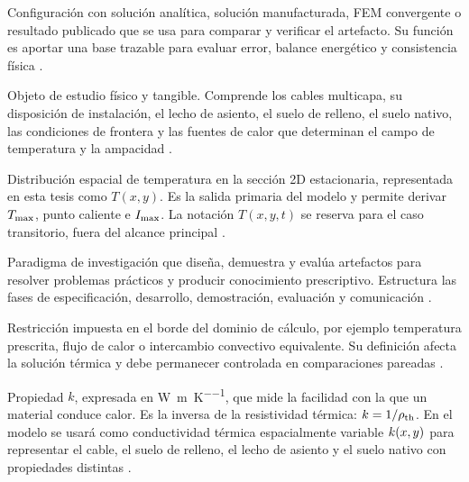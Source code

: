 \begin{description}[style=nextline,itemsep=0.5\baselineskip,parsep=0pt,topsep=0.25\baselineskip]
  \item[Caso de referencia o \textit{benchmark}.] Configuración con solución analítica, solución manufacturada, FEM convergente o resultado publicado que se usa para comparar y verificar el artefacto. Su función es aportar una base trazable para evaluar error, balance energético y consistencia física \parencites{cigre2022}[93--99]{cigre2025}.

  \item[Arreglo de cables--entorno térmico.] Objeto de estudio físico y tangible. Comprende los cables multicapa, su disposición de instalación, el lecho de asiento, el suelo de relleno, el suelo nativo, las condiciones de frontera y las fuentes de calor que determinan el campo de temperatura y la ampacidad \parencites[752--760]{neher1957}{anders2005}[3--5]{enescu2020}[4--6]{enescu2021}[1,10,16]{kim2025}.

  \item[Campo de temperatura.] Distribución espacial de temperatura en la sección 2D estacionaria, representada en esta tesis como $T(x,y)$. Es la salida primaria del modelo y permite derivar $T_{\max}$, punto caliente e $I_{\max}$. La notación $T(x,y,t)$ se reserva para el caso transitorio, fuera del alcance principal \parencites{carslaw1959conduction,kakac2018heatConduction,hahn2012heatConduction}[1,3,16]{pan2025}.

  \item[Ciencia del diseño o DSR.] Paradigma de investigación que diseña, demuestra y evalúa artefactos para resolver problemas prácticos y producir conocimiento prescriptivo. Estructura las fases de especificación, desarrollo, demostración, evaluación y comunicación \parencites[54--56]{peffers2007}[342--351]{gregor2013}[198--203]{delport2024}.

  \item[Condición de contorno.] Restricción impuesta en el borde del dominio de cálculo, por ejemplo temperatura prescrita, flujo de calor o intercambio convectivo equivalente. Su definición afecta la solución térmica y debe permanecer controlada en comparaciones pareadas \parencites{carslaw1959conduction,kakac2018heatConduction,hahn2012heatConduction}[3--5]{enescu2020}[3--4,93--99]{cigre2025}.

  \item[Conductividad térmica.] Propiedad $k$, expresada en \si{\watt\per\metre\per\kelvin}, que mide la facilidad con la que un material conduce calor. Es la inversa de la resistividad térmica: $k=1/\rho_{\mathrm{th}}$. En el modelo se usará como conductividad térmica espacialmente variable $k(x,y)$ para representar el cable, el suelo de relleno, el lecho de asiento y el suelo nativo con propiedades distintas \parencites{carslaw1959conduction,kakac2018heatConduction}{farouki1981thermal,devries1966thermal}[1,7]{khumalo2025}[secciones 4--6]{ieee442}.


\end{description}
